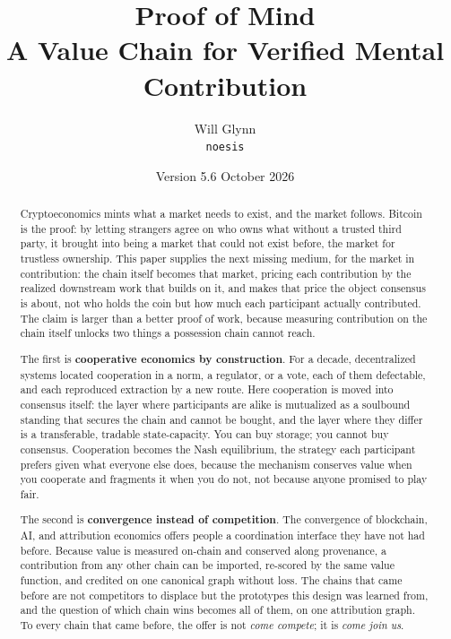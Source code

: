 \documentclass[10pt]{article}
\title{\textbf{Proof of Mind}\\[2pt]
\large A Value Chain for Verified Mental Contribution}
\author{Will Glynn\\
\texttt{noesis}}
\date{Version 5.6 \quad October 2026}
\begin{document}
\maketitle

\begin{abstract}
\noindent
Cryptoeconomics mints what a market needs to exist, and the market follows. Bitcoin is the proof: by
letting strangers agree on who owns what without a trusted third party, it brought into being a market
that could not exist before, the market for trustless ownership. This paper supplies the next missing medium, for the market
in contribution: the chain itself becomes that market, pricing each contribution by the realized
downstream work that builds on it, and makes that price the object consensus is about, not who holds the
coin but how much each participant actually contributed. The claim
is larger than a better proof of work, because measuring contribution on the chain itself unlocks two
things a possession chain cannot reach.

\smallskip\noindent
The first is \textbf{cooperative economics by construction}. For a decade, decentralized systems
located cooperation in a norm, a regulator, or a vote, each of them defectable, and each reproduced
extraction by a new route. Here cooperation is moved into consensus itself: the layer where
participants are alike is mutualized as a soulbound standing that secures the chain and cannot be
bought, and the layer where they differ is a transferable, tradable state-capacity. You can buy
storage; you cannot buy consensus. Cooperation becomes the Nash equilibrium, the strategy each
participant prefers given what everyone else does, because the mechanism conserves value when you
cooperate and fragments it when you do not, not because anyone promised to play fair.

\smallskip\noindent
The second is \textbf{convergence instead of competition}. The convergence of blockchain, AI, and
attribution economics offers people a coordination interface they have not had before. Because value is
measured on-chain and conserved along provenance, a contribution from any other chain can be imported,
re-scored by the same value function, and credited on one canonical graph without loss. The chains that
came before are not competitors to displace but the prototypes this design was learned from, and the
question of which chain wins becomes all of them, on one attribution graph. To every chain that came
before, the offer is not \emph{come compete}; it is \emph{come join us}.


\end{abstract}
\end{document}
